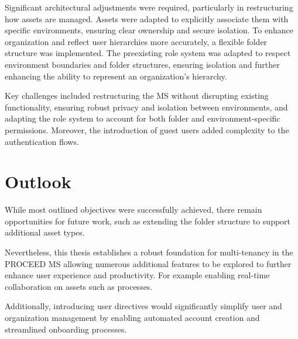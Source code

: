 Significant architectural adjustments were required, particularly in restructuring how assets are managed.
Assets were adapted to explicitly associate them with specific environments, ensuring clear ownership and secure isolation.
To enhance organization and reflect user hierarchies more accurately, a flexible folder structure was implemented.
The preexisting role system was adapted to respect environment boundaries and folder
structures, ensuring isolation and further enhancing the ability to represent an organization's hierarchy.

Key challenges included restructuring the MS without disrupting existing functionality,
ensuring robust privacy and isolation between environments,
and adapting the role system to account for both folder and environment-specific permissions.
Moreover, the introduction of guest users added complexity to the authentication flows.









\section{Outlook}
\label{cha:outlook}

%

While most outlined objectives were successfully achieved,
there remain opportunities for future work,
such as extending the folder structure to support additional asset types.

Nevertheless, this thesis establishes a robust foundation for multi-tenancy in the PROCEED
MS allowing numerous additional features to be explored to further enhance user experience and productivity.
For example enabling real-time collaboration on assets such as processes.

Additionally, introducing user directives would significantly simplify user and organization management by enabling automated account creation and streamlined onboarding processes. 

